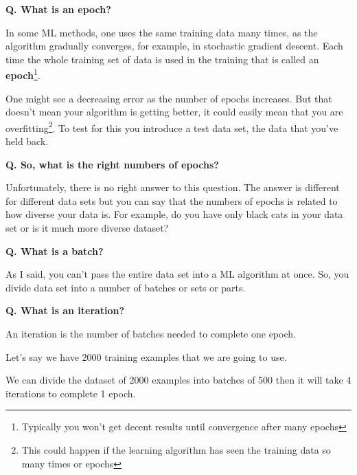 \begin{frame}[fragile]{\textbf{Q. What is an epoch?}}
  \begin{wideitemize}
    \item In some ML methods, one uses the same training data many times,
    as the algorithm gradually converges, for example, in stochastic gradient
    descent. Each time the whole training set of data is used in the training
    that is called an \textbf{epoch}\footnote{Typically you won't
    get decent results until convergence after many epochs}.
    \item One might see a decreasing error as the number of epochs increases.
    But that doesn't mean your algorithm is getting better, it could easily
    mean that you are overfitting\footnote{This could happen if the learning
    algorithm has seen the training data so many times or epochs}. To test for
    this you introduce a test data set, the data that you've held back.
  \end{wideitemize}
\end{frame}

\begin{frame}[fragile]{\textbf{Q. So, what is the right numbers of epochs?}}
  \begin{wideitemize}
    \item Unfortunately, there is no right answer to this question. The answer
    is different for different data sets but you can say that the numbers of
    epochs is related to how diverse your data is. For example, do you have
    only black cats in your data set or is it much more diverse dataset?
  \end{wideitemize}
\end{frame}

\begin{frame}[fragile]{\textbf{Q. What is a batch?}}
  \begin{wideitemize}
    \item As I said, you can't pass the entire data set into a ML algorithm at
    once. So, you divide data set into a number of batches or sets or parts.
  \end{wideitemize}
\end{frame}

\begin{frame}[fragile]{\textbf{Q. What is an iteration?}}
  \begin{wideitemize}
    \item An iteration is the number of batches needed to complete one epoch.
    \item Let's say we have 2000 training examples that we are going to use.
    \begin{wideitemize}
      \item We can divide the dataset of 2000 examples into batches of 500
      then it will take 4 iterations to complete 1 epoch.
    \end{wideitemize}
  \end{wideitemize}
\end{frame}

